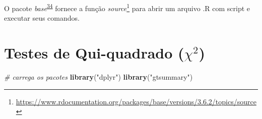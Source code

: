 \documentclass[
  a4paper,
]{book}
\newenvironment{Shaded}{\begin{snugshade}}{\end{snugshade}}
\newcommand{\CommentTok}[1]{\textcolor[rgb]{0.56,0.35,0.01}{\textit{#1}}}
\newcommand{\FunctionTok}[1]{\textcolor[rgb]{0.13,0.29,0.53}{\textbf{#1}}}
\newcommand{\NormalTok}[1]{#1}
\newcommand{\StringTok}[1]{\textcolor[rgb]{0.31,0.60,0.02}{#1}}
\renewcommand{\href}[2]{#2\footnote{\url{#1}}}
\newenvironment{infobox}[1]
  {
  \begin{itemize}
  \renewcommand{\labelitemi}{
    \raisebox{-.7\height}[0pt][0pt]{
      {\setkeys{Gin}{width=3em,keepaspectratio}
        \texttt{[image: \#1]}}
    }
  }
  \setlength{\fboxsep}{1em}
  \begin{blackbox}
  \item
  }
  {
  \end{blackbox}
  \end{itemize}
  }
\begin{document}
\begin{infobox}{images/Rlogo}
O pacote \emph{base}\textsuperscript{\protect\hyperlink{ref-base-2}{34}} fornece a função \href{https://www.rdocumentation.org/packages/base/versions/3.6.2/topics/source}{\emph{source}} para abrir um arquivo .R com script e executar seus comandos.

\end{infobox}

\hypertarget{testes-de-qui-quadrado-chi2}{%
\section{\texorpdfstring{Testes de Qui-quadrado (\(\chi^2\))}{Testes de Qui-quadrado (\textbackslash chi\^{}2)}}\label{testes-de-qui-quadrado-chi2}}

\begin{Shaded}
\begin{Highlighting}[]
\CommentTok{\# carrega os pacotes}
\FunctionTok{library}\NormalTok{(}\StringTok{"dplyr"}\NormalTok{)}
\FunctionTok{library}\NormalTok{(}\StringTok{"gtsummary"}\NormalTok{)}


\end{Highlighting}
\end{Shaded}
\end{document}

